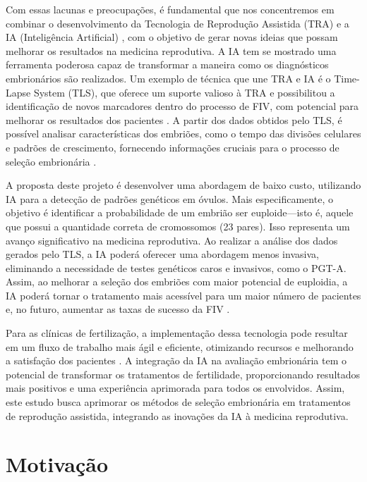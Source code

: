 Com essas lacunas e preocupações, é fundamental que nos concentremos em combinar o desenvolvimento da Tecnologia de Reprodução Assistida (TRA) e a IA (Inteligência Artificial) \cite{wang2019}, com o objetivo de gerar novas ideias  que possam melhorar os resultados na medicina reprodutiva. A IA tem se mostrado uma ferramenta poderosa capaz de transformar a maneira como os diagnósticos embrionários são realizados. Um exemplo de técnica que une TRA e IA é o Time-Lapse System (TLS), que oferece um suporte valioso à TRA e possibilitou a identificação de novos marcadores dentro do processo de FIV, com potencial para melhorar os resultados dos pacientes \cite{luong2023}. A partir dos dados obtidos pelo TLS, é possível analisar características dos embriões, como o tempo das divisões celulares e padrões de crescimento, fornecendo informações cruciais para o processo de seleção embrionária \cite{luong2023}.

A proposta deste projeto é desenvolver uma abordagem de baixo custo, utilizando IA para a detecção de padrões genéticos em óvulos. Mais especificamente, o objetivo é identificar a probabilidade de um embrião ser euploide—isto é, aquele que possui a quantidade correta de cromossomos (23 pares). Isso representa um avanço significativo na medicina reprodutiva. Ao realizar a análise dos dados gerados pelo TLS, a IA poderá oferecer uma abordagem menos invasiva, eliminando a necessidade de testes genéticos caros e invasivos, como o PGT-A. Assim, ao melhorar a seleção dos embriões com maior potencial de euploidia, a IA poderá tornar o tratamento mais acessível para um maior número de pacientes e, no futuro, aumentar as taxas de sucesso da FIV \cite{ramalho2024}.

Para as clínicas de fertilização, a implementação dessa tecnologia pode resultar em um fluxo de trabalho mais ágil e eficiente, otimizando recursos e melhorando a satisfação dos pacientes \cite{ramalho2024}. A integração da IA na avaliação embrionária tem o potencial de transformar os tratamentos de fertilidade, proporcionando resultados mais positivos e uma experiência aprimorada para todos os envolvidos. Assim, este estudo busca aprimorar os métodos de seleção embrionária em tratamentos de reprodução assistida, integrando as inovações da IA à medicina reprodutiva.


\section{Motivação}


